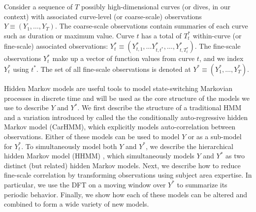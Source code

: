 
Consider a sequence of $T$ possibly high-dimensional curves (or dives, in our context) with associated curve-level (or coarse-scale) observations $Y \equiv \left(Y_1, \ldots, Y_T\right)$. The coarse-scale observations contain summaries of each curve such as duration or maximum value. Curve $t$ has a total of $T^*_t$ within-curve (or fine-scale) associated observations: $Y^*_t \equiv \left(Y^*_{t,1}, \ldots Y^*_{t,t^*}, \ldots, Y^*_{t,T^*_t}\right)$. The fine-scale observations $Y^*_t$ make up a vector of function values from curve $t$, and we index $Y^*_t$ using $t^*$. The set of all fine-scale observations is denoted at $Y^* \equiv \left(Y^*_1,\ldots,Y^*_T\right)$.

Hidden Markov models are useful tools to model state-switching Markovian processes in discrete time and will be used as the core structure of the models we use to describe $Y$ and $Y^*$. %
We first describe the structure of a traditional HMM and a variation introduced by \cite{Lawler:2019} called the the conditionally auto-regressive hidden Markov model (CarHMM), which explicitly models auto-correlation between observations. Either of these models can be used to model $Y$ or as a sub-model for $Y^*_t$. To simultaneously model both $Y$ and $Y^*$, we describe the hierarchical hidden Markov model (HHMM) \citep{Barajas:2017,Adam:2019}, which simultaneously models $Y$ and $Y^*$ as two distinct (but related) hidden Markov models. Next, we describe how to reduce fine-scale correlation by transforming observations using subject area expertise. In particular, we use the DFT on a moving window over $Y^*$ to summarize its periodic behavior. Finally, we show how each of these models can be altered and combined to form a wide variety of new models.

